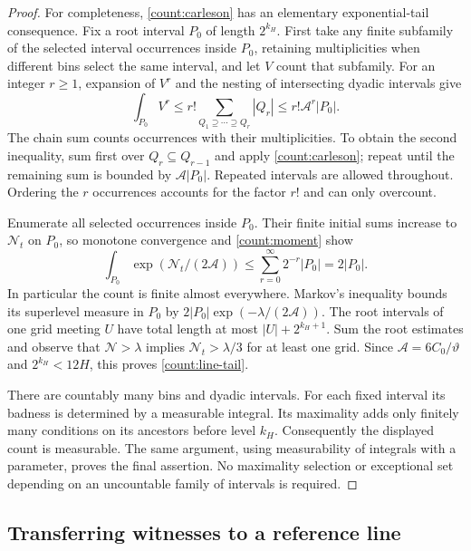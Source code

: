 \begin{proof}
For completeness, \eqref{count:carleson} has an elementary
exponential-tail consequence.  Fix a root interval $P_0$ of length
$2^{k_H}$.  First take any finite subfamily of the selected interval
occurrences inside $P_0$, retaining multiplicities when different
bins select the same interval, and let $V$ count that subfamily.
For an integer $r\geq1$, expansion of $V^r$ and the nesting of
intersecting dyadic intervals give
\begin{equation}\label{count:moment}
 \int_{P_0} V^r
 \leq r!\sum_{Q_1\supseteq\cdots\supseteq Q_r}|Q_r|
 \leq r!\mathcal A^r|P_0|.
\end{equation}
The chain sum counts occurrences with their multiplicities.
To obtain the second inequality, sum first over $Q_r\subseteq
Q_{r-1}$ and apply \eqref{count:carleson}; repeat until the
remaining sum is bounded by $\mathcal A|P_0|$.  Repeated intervals
are allowed throughout.  Ordering the $r$ occurrences accounts
for the factor $r!$ and can only overcount.

Enumerate all selected occurrences inside $P_0$.  Their finite
initial sums increase to $\mathcal N_t$ on $P_0$, so monotone
convergence and \eqref{count:moment} show
\begin{equation}\label{count:exponential-moment}
 \int_{P_0}\exp(\mathcal N_t/(2\mathcal A))
 \leq \sum_{r=0}^{\infty}2^{-r}|P_0|=2|P_0|.
\end{equation}
In particular the count is finite almost everywhere.  Markov's
inequality bounds its superlevel measure in $P_0$ by
$2|P_0|\exp(-\lambda/(2\mathcal A))$.
The root intervals of one grid meeting $U$ have total length at
most $|U|+2^{k_H+1}$.  Sum the root estimates and observe that
$\mathcal N>\lambda$ implies $\mathcal N_t>\lambda/3$ for at least
one grid.  Since $\mathcal A=6C_0/\vartheta$ and $2^{k_H}<12H$,
this proves \eqref{count:line-tail}.

There are countably many bins and dyadic intervals.  For each
fixed interval its badness is determined by a measurable integral.
Its maximality adds only finitely many conditions on its ancestors
before level $k_H$.  Consequently the displayed count is
measurable.  The same argument, using measurability of integrals
with a parameter, proves the final assertion.  No maximality
selection or exceptional set depending on an uncountable family
of intervals is required.
\end{proof}

\subsection{Transferring witnesses to a reference line}

